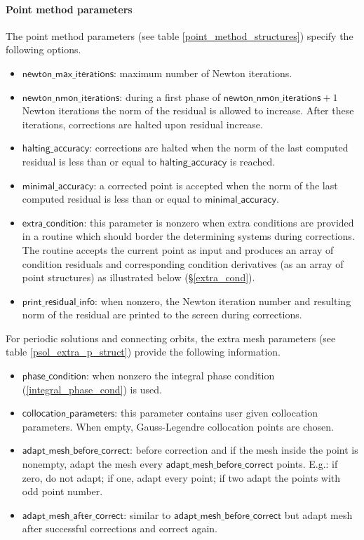 \documentclass[10pt]{article}
\gdef \file#1{{\bfseries{\ttfamily{#1}}}}
\gdef \parm#1{{\mathsf{#1}}}
\begin{document}
{\paragraph{Point method parameters}
The point method parameters (see table \ref{point_method_structures}) 
specify the following options.
\begin{itemize}
\item $\parm{newton\_max\_iterations}$: maximum number of Newton
iterations.    
\item $\parm{newton\_nmon\_iterations}$: during a first phase of 
$\parm{newton\_nmon\_iterations}+1$
Newton iterations the norm of the residual is allowed
to increase. After these iterations, corrections are halted
upon residual increase.
\item $\parm{halting\_accuracy}$: corrections are halted when
the norm of the last computed 
residual is less than or equal to $\parm{halting\_accuracy}$ 
is reached.  
\item $\parm{minimal\_accuracy}$: a corrected point is accepted
when the norm of the last computed residual is less than or equal
to $\parm{minimal\_accuracy}$.     
\item $\parm{extra\_condition}$: this parameter is nonzero
when extra conditions are provided in a routine \file{sys\_cond.m}
which should border the determining systems during corrections.
The routine accepts the current point as input and
produces an array of condition residuals and corresponding
condition derivatives (as an array of point structures) as
illustrated below (\S\ref{extra_cond}).
\item $\parm{print\_residual\_info}$: when nonzero, the Newton
iteration number and resulting
norm of the residual are printed to the screen during corrections.
\end{itemize}
For periodic solutions and connecting orbits,
the extra mesh parameters 
(see table \ref{psol_extra_p_struct}) provide the following
information.
\begin{itemize}
\item $\parm{phase\_condition}$: when nonzero the integral phase condition
(\ref{integral_phase_cond}) is used.        
\item $\parm{collocation\_parameters}$: this parameter contains user given
collocation parameters. When empty, Gauss-Legendre collocation points are
chosen.    
\item $\parm{adapt\_mesh\_before\_correct}$: before correction and if
the mesh inside the point is nonempty, adapt
the mesh every $\parm{adapt\_mesh\_before\_correct}$ points.
E.g.: if zero, do not adapt; if one, adapt every point; if two adapt the
points with odd point number.
\item $\parm{adapt\_mesh\_after\_correct}$: similar to 
$\parm{adapt\_mesh\_before\_correct}$ but adapt mesh after 
successful corrections and correct again. 
\end{itemize}

}
\end{document}
